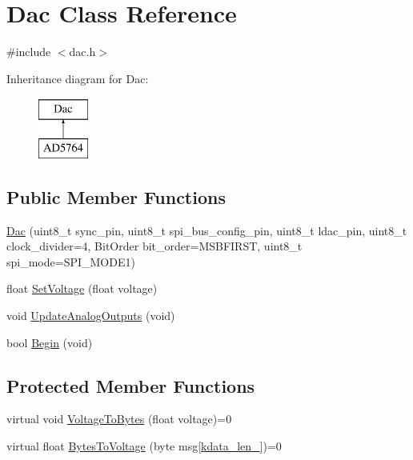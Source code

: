 \hypertarget{classDac}{}\section{Dac Class Reference}
\label{classDac}


{\ttfamily \#include $<$dac.\+h$>$}

Inheritance diagram for Dac\+:\begin{figure}[H]
\begin{center}
\leavevmode
\includegraphics[height=2.000000cm]{classDac}
\end{center}
\end{figure}
\subsection*{Public Member Functions}
\begin{DoxyCompactItemize}
\item 
\mbox{\hyperlink{classDac_ae74afbc4c82a8acbd8c74dcf4ea046ba}{Dac}} (uint8\+\_\+t sync\+\_\+pin, uint8\+\_\+t spi\+\_\+bus\+\_\+config\+\_\+pin, uint8\+\_\+t ldac\+\_\+pin, uint8\+\_\+t clock\+\_\+divider=4, Bit\+Order bit\+\_\+order=M\+S\+B\+F\+I\+R\+ST, uint8\+\_\+t spi\+\_\+mode=S\+P\+I\+\_\+\+M\+O\+D\+E1)
\item 
float \mbox{\hyperlink{classDac_a71ede236baa8fc67d18db38629e6c225}{Set\+Voltage}} (float voltage)
\item 
void \mbox{\hyperlink{classDac_aafef1707ec33a2166a69e9b646cd471b}{Update\+Analog\+Outputs}} (void)
\item 
bool \mbox{\hyperlink{classDac_ad88e0048e59c0633b72769ddb8337e49}{Begin}} (void)
\end{DoxyCompactItemize}
\subsection*{Protected Member Functions}
\begin{DoxyCompactItemize}
\item 
virtual void \mbox{\hyperlink{classDac_ac21022b2b921437418004af9ae7de8ae}{Voltage\+To\+Bytes}} (float voltage)=0
\item 
virtual float \mbox{\hyperlink{classDac_a1dc9be97cb41ddacbd8dde0c5d4243b4}{Bytes\+To\+Voltage}} (byte msg\mbox{[}\mbox{\hyperlink{classDac_af3de0bf669183e66ebf916f8c685fe6b}{kdata\+\_\+len\+\_\+}}\mbox{]})=0
\end{DoxyCompactItemize}
